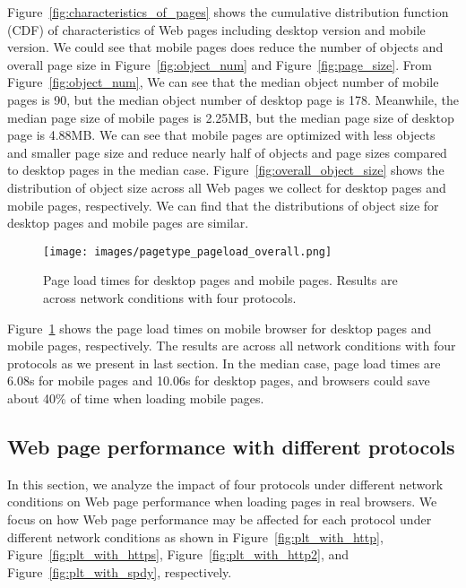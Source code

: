 Figure~\ref{fig:characteristics_of_pages} shows the cumulative distribution function (CDF) of  characteristics of Web pages including desktop version and mobile version. We could see that mobile pages does reduce the number of objects and overall page size in Figure~\ref{fig:object_num} and Figure~\ref{fig:page_size}. From Figure~\ref{fig:object_num}, We can see that the median object number of mobile pages is 90, but the median object number of desktop page is 178. Meanwhile, the median page size of mobile pages is 2.25MB, but the median page size of desktop page is 4.88MB. We can see that mobile pages are optimized with less objects and smaller page size and reduce nearly half of objects and page sizes compared to desktop pages in the median case. Figure~\ref{fig:overall_object_size} shows the distribution of object size across all Web pages we collect for desktop pages and mobile pages, respectively. We can find that the distributions of object size for desktop pages and mobile pages are similar.

\begin{figure}[htbp]
	\centering
    \texttt{[image: images/pagetype\_pageload\_overall.png]}
    \caption{Page load times for desktop pages and mobile pages. Results are across network conditions with four protocols.} \label{fig:pagetype_pageload_overall}
\end{figure}

Figure~\ref{fig:pagetype_pageload_overall} shows the page load times on mobile browser for desktop pages and mobile pages, respectively. The results are across all network conditions with four protocols as we present in last section. In the median case, page load times are 6.08s for mobile pages and 10.06s for desktop pages, and browsers could save about 40\% of time when loading mobile pages. 


\subsection{Web page performance with different protocols}

In this section, we analyze the impact of four protocols under different network conditions on Web page performance when loading pages in real browsers. We focus on how Web page performance may be affected for each protocol under different network conditions as shown in Figure~\ref{fig:plt_with_http}, Figure~\ref{fig:plt_with_https}, Figure~\ref{fig:plt_with_http2}, and Figure~\ref{fig:plt_with_spdy}, respectively.

